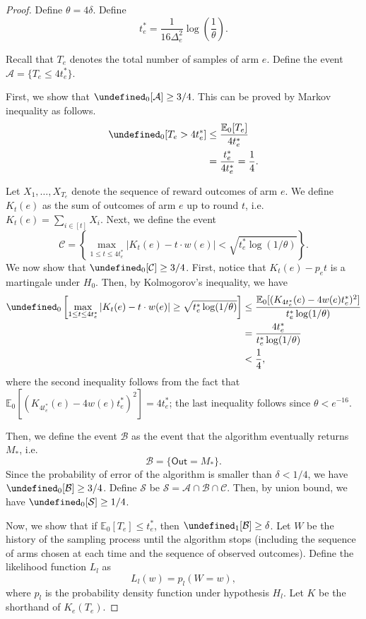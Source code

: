 \documentclass{article}
\newcommand{\E}{\mathbb E}
\newcommand{\out}{\mathsf{Out}}
\let\Pr\undefined
\DeclareMathOperator{\Pr}{Pr}
\begin{document}
\begin{spacing}{1.1}
\begin{proof}
Define $\theta=4\delta$. Define
\begin{equation}
t_e^* = \frac{1}{16\Delta^2_e}\log\left(\frac{1}{\theta}\right).
\label{eq:define-tstar}
\end{equation}

Recall that $T_e$ denotes the total number of samples of arm $e$.
Define the event
$\mathcal A = \{T_e \le 4t_e^* \}$.

First, we show that $\Pr_0[\mathcal A] \ge 3/4$. 
This can be proved by Markov inequality as follows.
\begin{align*}
\Pr_0[T_e > 4t_e^*] &\le \frac{\E_0[T_e]}{4t_e^*} \\
					  &= \frac{t_e^*}{4t_e^*} = \frac14.
\end{align*}

Let $X_1,\ldots,X_{T_e}$ denote the sequence of reward outcomes of arm $e$.
We define $K_t(e)$ as the sum of outcomes of arm $e$ up to round $t$, i.e. $K_t(e) = \sum_{i\in [t]} X_i. $
Next, we define the event 
$$
\mathcal C=\left\{\max_{1\le t \le 4t_e^*} \left|K_t(e)-t\cdot w(e)\right|  < \sqrt{t_e^*\log(1/\theta)} \right\}.
$$
We now show that $\Pr_0[\mathcal C] \ge 3/4$.
First, notice that $K_t(e)-p_e t$ is a martingale under $H_0$.
Then, by Kolmogorov's inequality, we have
\begin{align*}
\Pr_0\left[\max_{1\le t \le 4t_e^*} \left|K_t(e)-t\cdot w(e)\right| \ge \sqrt{t_e^*\log(1/\theta)} \right]
&\le \frac{\E_0[ (K_{4t_e^*}(e)-4w(e)t_e^*)^2]}{t_e^*\log(1/\theta)}\\
&= \frac{4t_e^*}{t_e^*\log(1/\theta)}\\
&< \frac14,
\end{align*}
where the second inequality follows from the fact that $\E_0[(K_{4t_e^*}(e)-4w(e)t_e^*)^2] = 4t_e^*$; the last inequality follows 
since $\theta < e^{-16}$.

Then, we define the event $\mathcal B$ as the event that the algorithm eventually returns $M_*$, i.e.
$$
\mathcal B=\{\out=M_*\}.
$$
Since the probability of error of the algorithm is smaller than $\delta < 1/4$, we have $\Pr_0[\mathcal B] \ge 3/4$.
Define $\mathcal S$ be $\mathcal S=\mathcal A\cap \mathcal B \cap \mathcal C$. 
Then, by union bound, we have $\Pr_0[\mathcal S]\ge 1/4$.

Now, we show that if $\E_0[T_e] \le t_e^*$, then $\Pr_1[\mathcal B] \ge \delta$.
Let $W$ be the history of the sampling process until the algorithm stops (including the sequence of arms chosen at each time and the sequence of observed outcomes).
Define the likelihood function $L_l$ as 
$$
L_l(w) = p_l(W=w),
$$
where $p_l$ is the probability density function under hypothesis $H_l$.
Let $K$ be the shorthand of $K_e(T_e)$.


\end{proof}
\end{spacing}
\end{document}
